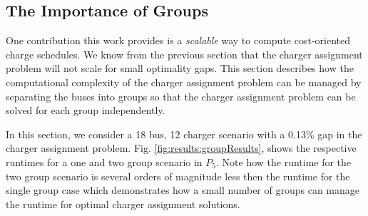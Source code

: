 \subsection{The Importance of Groups}
One contribution this work provides is a {\it scalable} way to compute cost-oriented charge schedules. We know from the previous section that the charger assignment problem will not scale for small optimality gaps. This section describes how the computational complexity of the charger assignment problem can be managed by separating the buses into groups so that the charger assignment problem can be solved for each group independently. 
\par In this section, we consider a 18 bus, 12 charger scenario with a 0.13\% gap in the charger assignment problem. Fig. \ref{fig:results:groupResults}, shows the respective runtimes for a one and two group scenario in $P_5$. Note how the runtime for the two group scenario is several orders of magnitude less then the runtime for the single group case which demonstrates how a small number of groups can manage the runtime for optimal charger assignment solutions.
 
